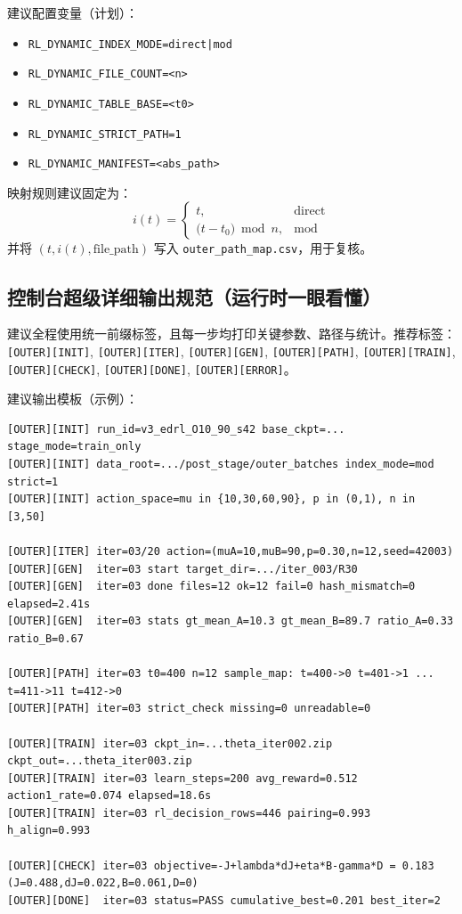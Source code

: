 \documentclass[UTF8,11pt,a4paper]{ctexart}
\begin{document}
建议配置变量（计划）：
\begin{itemize}
\item \texttt{RL\_DYNAMIC\_INDEX\_MODE=direct|mod}
\item \texttt{RL\_DYNAMIC\_FILE\_COUNT=<n>}
\item \texttt{RL\_DYNAMIC\_TABLE\_BASE=<t0>}
\item \texttt{RL\_DYNAMIC\_STRICT\_PATH=1}
\item \texttt{RL\_DYNAMIC\_MANIFEST=<abs\_path>}
\end{itemize}

映射规则建议固定为：
\begin{equation}
i(t)=
\begin{cases}
t, & \text{direct}\\
\big(t-t_0\big)\bmod n, & \text{mod}
\end{cases}
\end{equation}
并将 $(t,i(t),\text{file\_path})$ 写入 \texttt{outer\_path\_map.csv}，用于复核。

\subsection{控制台超级详细输出规范（运行时一眼看懂）}
建议全程使用统一前缀标签，且每一步均打印关键参数、路径与统计。推荐标签：
\texttt{[OUTER][INIT]}, \texttt{[OUTER][ITER]}, \texttt{[OUTER][GEN]}, \texttt{[OUTER][PATH]},
\texttt{[OUTER][TRAIN]}, \texttt{[OUTER][CHECK]}, \texttt{[OUTER][DONE]}, \texttt{[OUTER][ERROR]}。

建议输出模板（示例）：
\begin{verbatim}
[OUTER][INIT] run_id=v3_edrl_O10_90_s42 base_ckpt=... stage_mode=train_only
[OUTER][INIT] data_root=.../post_stage/outer_batches index_mode=mod strict=1
[OUTER][INIT] action_space=mu in {10,30,60,90}, p in (0,1), n in [3,50]

[OUTER][ITER] iter=03/20 action=(muA=10,muB=90,p=0.30,n=12,seed=42003)
[OUTER][GEN]  iter=03 start target_dir=.../iter_003/R30
[OUTER][GEN]  iter=03 done files=12 ok=12 fail=0 hash_mismatch=0 elapsed=2.41s
[OUTER][GEN]  iter=03 stats gt_mean_A=10.3 gt_mean_B=89.7 ratio_A=0.33 ratio_B=0.67

[OUTER][PATH] iter=03 t0=400 n=12 sample_map: t=400->0 t=401->1 ... t=411->11 t=412->0
[OUTER][PATH] iter=03 strict_check missing=0 unreadable=0

[OUTER][TRAIN] iter=03 ckpt_in=...theta_iter002.zip ckpt_out=...theta_iter003.zip
[OUTER][TRAIN] iter=03 learn_steps=200 avg_reward=0.512 action1_rate=0.074 elapsed=18.6s
[OUTER][TRAIN] iter=03 rl_decision_rows=446 pairing=0.993 h_align=0.993

[OUTER][CHECK] iter=03 objective=-J+lambda*dJ+eta*B-gamma*D = 0.183 (J=0.488,dJ=0.022,B=0.061,D=0)
[OUTER][DONE]  iter=03 status=PASS cumulative_best=0.201 best_iter=2
\end{verbatim}
\end{document}
